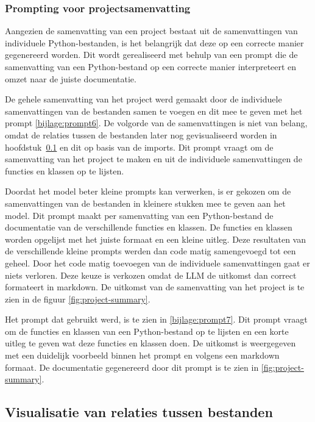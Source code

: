 \subsubsection{Prompting voor projectsamenvatting}
\label{sec:project-documentatie-prompting}

Aangezien de samenvatting van een project bestaat uit de samenvattingen van individuele Python-bestanden, is het belangrijk dat deze op een correcte manier gegenereerd worden.
Dit wordt gerealiseerd met behulp van een prompt die de samenvatting van een Python-bestand op een correcte manier interpreteert en omzet naar de juiste documentatie.

De gehele samenvatting van het project werd gemaakt door de individuele samenvattingen van de bestanden samen te voegen en dit mee te geven met het prompt \ref{bijlage:prompt6}.
De volgorde van de samenvattingen is niet van belang, omdat de relaties tussen de bestanden later nog gevisualiseerd worden in hoofdstuk~\ref{sec:project-documentatie-relaties} en dit op basis van de imports.
Dit prompt vraagt om de samenvatting van het project te maken en uit de individuele samenvattingen de functies en klassen op te lijsten.

Doordat het model beter kleine prompts kan verwerken, is er gekozen om de samenvattingen van de bestanden in kleinere stukken mee te geven aan het model.
Dit prompt maakt per samenvatting van een Python-bestand de documentatie van de verschillende functies en klassen. 
De functies en klassen worden opgelijst met het juiste formaat en een kleine uitleg.
Deze resultaten van de verschillende kleine prompts werden dan code matig samengevoegd tot een geheel. 
Door het code matig toevoegen van de individuele samenvattingen gaat er niets verloren. 
Deze keuze is verkozen omdat de LLM de uitkomst dan correct formateert in markdown.  
De uitkomst van de samenvatting van het project is te zien in de figuur \ref{fig:project-summary}.

Het prompt dat gebruikt werd, is te zien in \ref{bijlage:prompt7}.
Dit prompt vraagt om de functies en klassen van een Python-bestand op te lijsten en een korte uitleg te geven wat deze functies en klassen doen.
De uitkomst is weergegeven met een duidelijk voorbeeld binnen het prompt en volgens een markdown formaat. 
De documentatie gegenereerd door dit prompt is te zien in \ref{fig:project-summary}.

\subsection{Visualisatie van relaties tussen bestanden}
\label{sec:project-documentatie-relaties}

